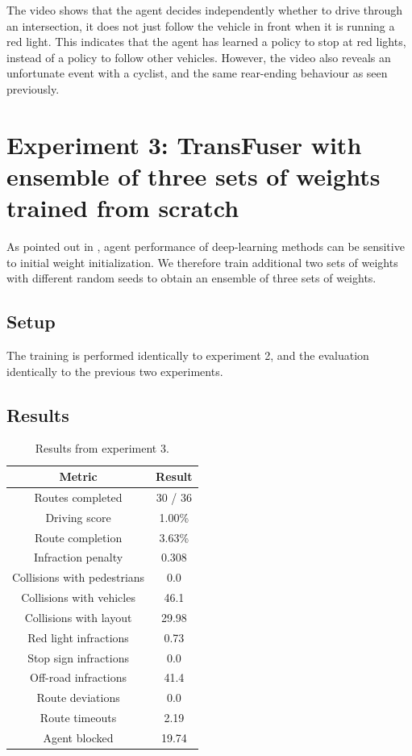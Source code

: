 The video shows that the agent decides independently whether to drive through an intersection,
it does not just follow the vehicle in front when it is running a red light.
This indicates that the agent has learned
a policy to stop at red lights,
instead of a policy to follow other vehicles.
However, the video also reveals an unfortunate event with a cyclist,
and the same rear-ending behaviour as seen previously.


\section{Experiment 3: TransFuser with ensemble of three sets of weights trained from scratch}
\label{sec:exp3}
As pointed out in \cite{transfuser-pami},
agent performance of deep-learning methods can be sensitive to initial weight initialization.
We therefore train additional two sets of weights with different random seeds to obtain an ensemble of three sets of weights.

\subsection{Setup}
The training is performed identically to experiment 2,
and the evaluation identically to the previous two experiments.


\subsection{Results}

\begin{table}[]
    \centering
    \begin{tabular}{|c|c|}
        \hline
        \textbf{Metric} & \textbf{Result} \\ \hline
        Routes completed & 30 / 36 \\ \hline
        Driving score & 1.00\% \\ \hline
        Route completion & 3.63\% \\ \hline
        Infraction penalty & 0.308 \\ \hline
        Collisions with pedestrians & 0.0 \\ \hline
        Collisions with vehicles & 46.1 \\ \hline
        Collisions with layout & 29.98 \\ \hline
        Red light infractions & 0.73 \\ \hline
        Stop sign infractions & 0.0 \\ \hline
        Off-road infractions & 41.4 \\ \hline
        Route deviations & 0.0 \\ \hline
        Route timeouts & 2.19 \\ \hline
        Agent blocked & 19.74 \\ \hline
    \end{tabular}
    \caption{Results from experiment 3.}
    \label{tab:exp3:results}
\end{table}

